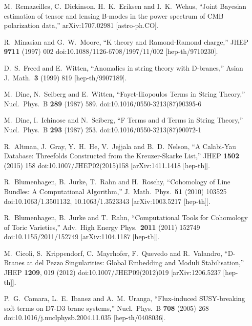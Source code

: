 \documentclass[11pt,a4paper]{article}
\begin{document}
\begin{thebibliography}{99}
  M.~Remazeilles, C.~Dickinson, H.~K.~Eriksen and I.~K.~Wehus,
  ``Joint Bayesian estimation of tensor and lensing B-modes in the power spectrum of CMB polarization data,''
  arXiv:1707.02981 [astro-ph.CO].
	
  R.~Minasian and G.~W.~Moore,
  ``K theory and Ramond-Ramond charge,''
  JHEP {\bf 9711} (1997) 002
  doi:10.1088/1126-6708/1997/11/002
  [hep-th/9710230].

  D.~S.~Freed and E.~Witten,
  ``Anomalies in string theory with D-branes,''
  Asian J.\ Math.\  {\bf 3} (1999) 819
  [hep-th/9907189].

  M.~Dine, N.~Seiberg and E.~Witten,
  ``Fayet-Iliopoulos Terms in String Theory,''
  Nucl.\ Phys.\ B {\bf 289} (1987) 589.
  doi:10.1016/0550-3213(87)90395-6
	
  M.~Dine, I.~Ichinose and N.~Seiberg,
  ``F Terms and d Terms in String Theory,''
  Nucl.\ Phys.\ B {\bf 293} (1987) 253.
  doi:10.1016/0550-3213(87)90072-1

  R.~Altman, J.~Gray, Y.~H.~He, V.~Jejjala and B.~D.~Nelson,
  ``A Calabi-Yau Database: Threefolds Constructed from the Kreuzer-Skarke List,''
  JHEP {\bf 1502} (2015) 158
  doi:10.1007/JHEP02(2015)158
  [arXiv:1411.1418 [hep-th]].

  R.~Blumenhagen, B.~Jurke, T.~Rahn and H.~Roschy,
  ``Cohomology of Line Bundles: A Computational Algorithm,''
  J.\ Math.\ Phys.\  {\bf 51} (2010) 103525
  doi:10.1063/1.3501132, 10.1063/1.3523343
  [arXiv:1003.5217 [hep-th]].

  R.~Blumenhagen, B.~Jurke and T.~Rahn,
  ``Computational Tools for Cohomology of Toric Varieties,''
  Adv.\ High Energy Phys.\  {\bf 2011} (2011) 152749
  doi:10.1155/2011/152749
  [arXiv:1104.1187 [hep-th]].

  M.~Cicoli, S.~Krippendorf, C.~Mayrhofer, F.~Quevedo and R.~Valandro,
  ``D-Branes at del Pezzo Singularities: Global Embedding and Moduli Stabilisation,''
  JHEP {\bf 1209}, 019 (2012)
  doi:10.1007/JHEP09(2012)019
  [arXiv:1206.5237 [hep-th]].

  P.~G.~Camara, L.~E.~Ibanez and A.~M.~Uranga,
  ``Flux-induced SUSY-breaking soft terms on D7-D3 brane systems,''
  Nucl.\ Phys.\ B {\bf 708} (2005) 268
  doi:10.1016/j.nuclphysb.2004.11.035
  [hep-th/0408036].


\end{thebibliography}
\end{document}
